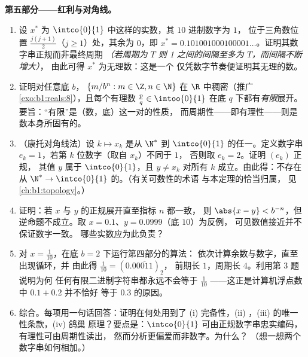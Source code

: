 \begin{problem}
\medskip
\noindent\textbf{第五部分——红利与对角线。}
\begin{enumerate}[resume]
  \item 设 $x^*$ 为 $\intco{0}{1}$ 中这样的实数，其 $10$ 进制数字为 $1$，
        位于三角数位置 $\frac{j(j +
        1)}{2}$（$j \geq 1$）处，其余为 $0$，即 $x^* =
        0.101001000100001\dots$。证明其数字串正规而非最终周期
        \emph{（若周期为 $T$
        则 1 之间的间隔至多为 $T$，而间隔不断增大）}，
        由此可得 $x^*$ 为无理数：这是一个
        仅凭数字节奏便证明其无理的数。
  \item 证明对任意底 $b$， $\{m/b^n : m \in \Z,
        n \in \N\}$ 在 $\R$ 中稠密（推广
        \cref{exo:b1:reals:8}），且每个有理数 $\frac pq
        \in \intoo{0}{1}$ 在底 $q$ 下都有\emph{有限}展开。
        要旨：“有限”是（数，底）这一对的性质，
        而周期性——即有理性——则是
        数本身所固有的。
  \item （康托对角线法）设 $k \mapsto x_k$ 是从
        $\N^*$ 到 $\intco{0}{1}$ 的任一。定义数字串 $e_k =
        1$，若第 $k$ 位数字（取自 $x_k$）不同于 $1$，
        否则取 $e_k = 2$。证明 $(e_k)$ 正规，
        其值 $y$ 属于 $\intco{0}{1}$，且 $y \neq
        x_k$ 对所有 $k$ 成立。由此得：不存在从 $\N^* \to
        \intco{0}{1}$ 的。（有关可数性的术语
        与本定理的恰当归属，
        见\cref{ch:b1:topology}。）
  \item 证明：若 $x$ 与 $y$ 的正规展开直至指标 $n$ 都一致，
        则 $\abs{x - y} < b^{-n}$，但逆命题不成立。取
        $x = 0.1$、$y = 0.0999$（底 $10$）为反例，
        可见数值接近并不保证数字一致。
        哪些实数应为此负责？
  \item 对 $x = \frac{1}{10}$，在底 $b = 2$ 下运行第四部分的算法：
        依次计算余数与数字，直至出现循环，并
        由此得 $\frac{1}{10} = (0.0\overline{0011})_2$，
        前期长 $1$，周期长 $4$。利用第 3 题说明为何
        任何有限二进制字符串都永远不会等于 $\frac{1}{10}$
——这正是计算机浮点数中 $0.1 + 0.2$ 并不恰好
        等于 $0.3$ 的原因。
  \item 综合。每项用一句话回答：证明在何处用到了
        (i) 完备性，(ii) ，(iii)
        的唯一性条款，(iv) 鸽巢
        原理？要点是：$\intco{0}{1}$ 可由正规数字串忠实编码，
        有理性可由周期性读出，
        然而分析更偏爱而非数字。为什么？
        （想一想两个数字串如何相加。）
\end{enumerate}
\end{problem}
